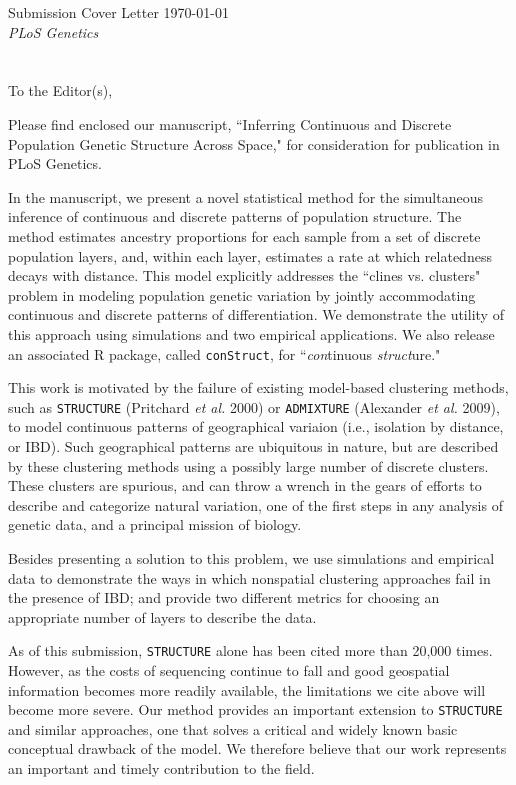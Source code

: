 \documentclass[11pt]{letter}
\begin{document}
Submission Cover Letter \hfill	\today\\
\emph{PLoS Genetics}
\\\\\\
To the Editor(s),

Please find enclosed our manuscript,  
``Inferring Continuous and Discrete Population Genetic Structure Across Space,"
for consideration for publication in PLoS Genetics.

In the manuscript, we present a novel statistical method 
for the simultaneous inference of continuous and discrete patterns of population structure.
The method estimates ancestry proportions for each 
sample from a set of discrete population layers, 
and, within each layer, estimates a rate at which relatedness decays with distance.
This model explicitly addresses the ``clines vs. clusters" problem in 
modeling population genetic variation by jointly accommodating 
continuous and discrete patterns of differentiation. 
We demonstrate the utility of this approach using simulations 
and two empirical applications.
We also release an associated R package, called \texttt{conStruct}, 
for ``\emph{con}tinuous \emph{struct}ure."

This work is motivated by the failure of existing model-based clustering methods, 
such as \texttt{STRUCTURE} (Pritchard \emph{et al.} 2000)
or \texttt{ADMIXTURE} (Alexander \emph{et al.} 2009), 
to model continuous patterns of geographical variaion (i.e., isolation by distance, or IBD).
Such geographical patterns are ubiquitous in nature,
but are described by these clustering methods using a possibly large number of discrete clusters.
These clusters are spurious, and can throw a 
wrench in the gears of efforts to describe and categorize natural variation, 
one of the first steps in any analysis of genetic data, 
and a principal mission of biology.  

Besides presenting a solution to this problem,
we use simulations and empirical data to demonstrate 
the ways in which nonspatial clustering approaches 
fail in the presence of IBD; 
and provide two different metrics for choosing an appropriate 
number of layers to describe the data.

As of this submission, \texttt{STRUCTURE} alone has been cited more than 20,000 times.
However, as the costs of sequencing continue to fall
and good geospatial information becomes more readily available,
the limitations we cite above will become more severe.
Our method provides an important extension to \texttt{STRUCTURE} and similar approaches, 
one that solves a critical and widely known basic conceptual drawback of the model. 
We therefore believe that our work represents an 
important and timely contribution to the field.
\end{document}
